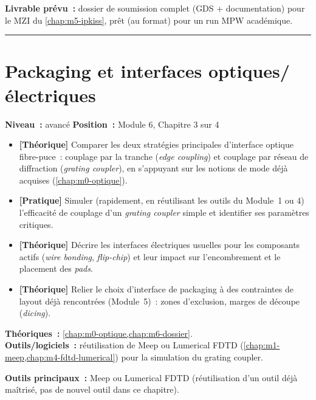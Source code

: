 \noindent\textbf{Livrable prévu~:} dossier de soumission complet (GDS + documentation) pour le MZI du \cref{chap:m5-ipkiss}, prêt (au format) pour un run MPW académique.

\bigskip\hrule\bigskip

\chapter{Packaging et interfaces optiques/électriques}
\label{chap:m6-packaging}

\noindent\textbf{Niveau~:} avancé \hfill \textbf{Position~:} Module 6, Chapitre 3 sur 4

\begin{objectifs}
\begin{itemize}[leftmargin=1.4em]
  \item \textbf{[Théorique]} Comparer les deux stratégies principales d'interface optique fibre-puce~: couplage par la tranche (\emph{edge coupling}) et couplage par réseau de diffraction (\emph{grating coupler}), en s'appuyant sur les notions de mode déjà acquises (\cref{chap:m0-optique}).
  \item \textbf{[Pratique]} Simuler (rapidement, en réutilisant les outils du Module~1 ou 4) l'efficacité de couplage d'un \emph{grating coupler} simple et identifier ses paramètres critiques.
  \item \textbf{[Théorique]} Décrire les interfaces électriques usuelles pour les composants actifs (\emph{wire bonding}, \emph{flip-chip}) et leur impact sur l'encombrement et le placement des \emph{pads}.
  \item \textbf{[Théorique]} Relier le choix d'interface de packaging à des contraintes de layout déjà rencontrées (Module~5)~: zones d'exclusion, marges de découpe (\emph{dicing}).
\end{itemize}
\end{objectifs}

\begin{prerequis}
\textbf{Théoriques~:} \cref{chap:m0-optique,chap:m6-dossier}.\\
\textbf{Outils/logiciels~:} réutilisation de Meep ou Lumerical FDTD (\cref{chap:m1-meep,chap:m4-fdtd-lumerical}) pour la simulation du grating coupler.
\end{prerequis}

\noindent\textbf{Outils principaux~:} Meep ou Lumerical FDTD (réutilisation d'un outil déjà maîtrisé, pas de nouvel outil dans ce chapitre).

